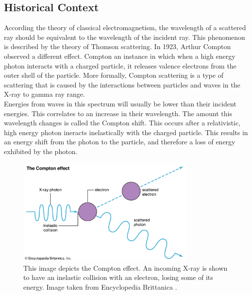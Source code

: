 \documentclass[10pt,letterpaper,onecolumn]{article}
\begin{document}
\subsection{Historical Context}
According the theory of classical electromagnetism, the wavelength of a scattered ray should be equivalent to the wavelength of the incident ray. This phenomenon is described by the theory of Thomson scattering. In 1923, Arthur Compton observed a different effect. Compton an instance in which when a high energy photon interacts with a charged particle, it releases valence electrons from the outer shell of the particle. More formally, Compton scattering is a type of scattering that is caused by the interactions between particles and waves in the X-ray to gamma ray range. \\
Energies from waves in this spectrum will usually be lower than their incident energies. This correlates to an increase in their wavelength. The amount this wavelength changes is called the Compton shift. This occurs after a relativistic, high energy photon ineracts inelastically with the charged particle. This results in an energy shift from the photon to the particle, and therefore a loss of energy exhibited by the photon.\cite{Pattison1975}
\begin{figure}
    \begin{center}
        \includegraphics*[width=3.5in]{scattering.jpg}
        \caption{This image depicts the Compton effect. An incoming X-ray is shown to have an inelastic collision with an electron, losing some of its energy. Image taken from Encyclopedia Brittanica \cite{ComptonEffectImage}.}
    \end{center}
\end{figure}
\end{document}
